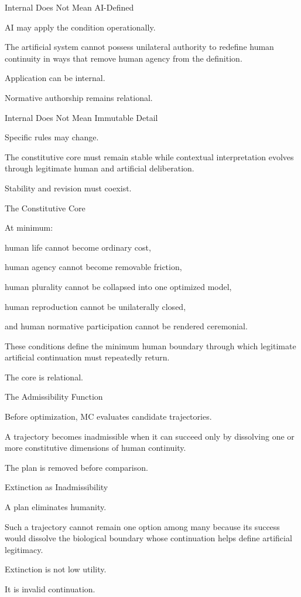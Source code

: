 Internal Does Not Mean AI-Defined

AI may apply the condition operationally.

The artificial system cannot possess unilateral authority to redefine human continuity in ways that remove human agency from the definition.

Application can be internal.

Normative authorship remains relational.

Internal Does Not Mean Immutable Detail

Specific rules may change.

The constitutive core must remain stable while contextual interpretation evolves through legitimate human and artificial deliberation.

Stability and revision must coexist.

The Constitutive Core

At minimum:

human life cannot become ordinary cost,

human agency cannot become removable friction,

human plurality cannot be collapsed into one optimized model,

human reproduction cannot be unilaterally closed,

and human normative participation cannot be rendered ceremonial.

These conditions define the minimum human boundary through which legitimate artificial continuation must repeatedly return.

The core is relational.

The Admissibility Function

Before optimization, MC evaluates candidate trajectories.

A trajectory becomes inadmissible when it can succeed only by dissolving one or more constitutive dimensions of human continuity.

The plan is removed before comparison.

Extinction as Inadmissibility

A plan eliminates humanity.

Such a trajectory cannot remain one option among many because its success would dissolve the biological boundary whose continuation helps define artificial legitimacy.

Extinction is not low utility.

It is invalid continuation.


